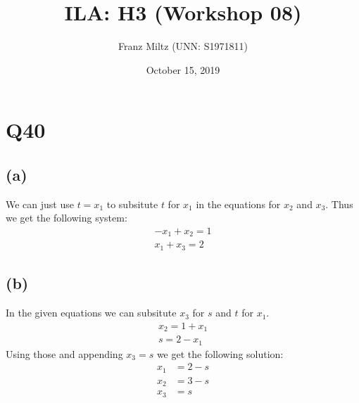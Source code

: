 \documentclass{article}
\title{ILA: H3 (Workshop 08)}
\author{Franz Miltz (UNN: S1971811)}
\date{October 15, 2019}
\begin{document}
\maketitle
\section*{Q40}
\subsection*{(a)}
We can just use $t=x_1$ to subsitute $t$ for $x_1$ in the equations for $x_2$ and $x_3$. Thus we get the following system:
\begin{align*}
    -x_1+x_2=1\\
    x_1+x_3=2 
\end{align*}
\subsection*{(b)}
In the given equations we can subsitute $x_3$ for $s$ and $t$ for $x_1$.
\begin{align*}
    x_2 = 1 + x_1\\
    s = 2 - x_1
\end{align*}
Using those and appending $x_3=s$ we get the following solution:
\begin{align*}
    x_1 &= 2-s\\ 
    x_2 &= 3-s\\ 
    x_3 &= s
\end{align*}
\end{document}
